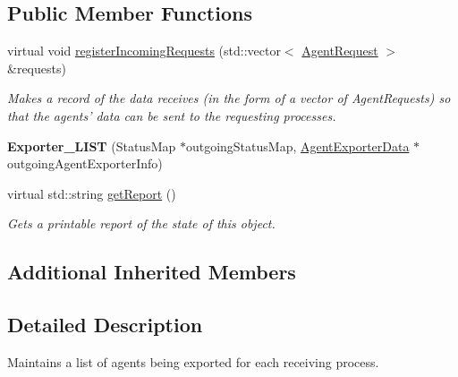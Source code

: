 \subsection*{Public Member Functions}
\begin{DoxyCompactItemize}
\item 
\hypertarget{classrepast_1_1_exporter___l_i_s_t_af3ef5c07f5a8d1eb38c5b97727f92c9e}{virtual void \hyperlink{classrepast_1_1_exporter___l_i_s_t_af3ef5c07f5a8d1eb38c5b97727f92c9e}{register\-Incoming\-Requests} (std\-::vector$<$ \hyperlink{classrepast_1_1_agent_request}{Agent\-Request} $>$ \&requests)}\label{classrepast_1_1_exporter___l_i_s_t_af3ef5c07f5a8d1eb38c5b97727f92c9e}

\begin{DoxyCompactList}\small\item\em Makes a record of the data receives (in the form of a vector of Agent\-Requests) so that the agents' data can be sent to the requesting processes. \end{DoxyCompactList}\item 
\hypertarget{classrepast_1_1_exporter___l_i_s_t_a2df4abe8a73a23ec17bd02ec05833ec4}{{\bfseries Exporter\-\_\-\-L\-I\-S\-T} (Status\-Map $\ast$outgoing\-Status\-Map, \hyperlink{classrepast_1_1_agent_exporter_data}{Agent\-Exporter\-Data} $\ast$outgoing\-Agent\-Exporter\-Info)}\label{classrepast_1_1_exporter___l_i_s_t_a2df4abe8a73a23ec17bd02ec05833ec4}

\item 
\hypertarget{classrepast_1_1_exporter___l_i_s_t_a6b868c012bd5547d510f862c8bce620d}{virtual std\-::string \hyperlink{classrepast_1_1_exporter___l_i_s_t_a6b868c012bd5547d510f862c8bce620d}{get\-Report} ()}\label{classrepast_1_1_exporter___l_i_s_t_a6b868c012bd5547d510f862c8bce620d}

\begin{DoxyCompactList}\small\item\em Gets a printable report of the state of this object. \end{DoxyCompactList}\end{DoxyCompactItemize}
\subsection*{Additional Inherited Members}


\subsection{Detailed Description}
Maintains a list of agents being exported for each receiving process. 

